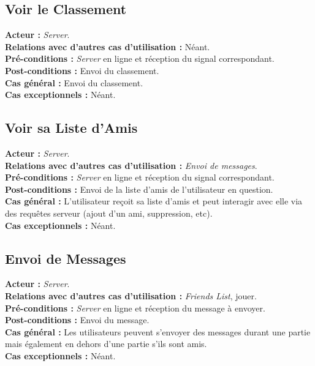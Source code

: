 \documentclass[10pt, a4paper]{article}
\begin{document}
\subsection{Voir le Classement}
\textbf{Acteur :} \textit{Server}. \\
\textbf{Relations avec d'autres cas d'utilisation :} Néant. \\
\textbf{Pré-conditions :} \textit{Server} en ligne et réception du signal correspondant. \\
\textbf{Post-conditions :} Envoi du classement. \\
\textbf{Cas général :} Envoi du classement. \\
\textbf{Cas exceptionnels :} Néant. \\

\subsection{Voir sa Liste d'Amis}
\textbf{Acteur :} \textit{Server}. \\
\textbf{Relations avec d'autres cas d'utilisation :} {\itshape Envoi de messages}. \\
\textbf{Pré-conditions :} \textit{Server} en ligne et réception du signal correspondant. \\
\textbf{Post-conditions :} Envoi de la liste d'amis de l'utilisateur en question. \\
\textbf{Cas général :} L'utilisateur reçoit sa liste d'amis et peut interagir avec elle via des requêtes serveur (ajout d'un ami, suppression, etc).\\
\textbf{Cas exceptionnels :} Néant. \\

\subsection{Envoi de Messages}
\textbf{Acteur :} \textit{Server}. \\
\textbf{Relations avec d'autres cas d'utilisation :} \textit{Friends List}, jouer. \\
\textbf{Pré-conditions :} \textit{Server} en ligne et réception du message à envoyer. \\
\textbf{Post-conditions :} Envoi du message. \\
\textbf{Cas général :} Les utilisateurs peuvent s'envoyer des messages durant une partie mais également en dehors d'une partie s'ils sont amis. \\
\textbf{Cas exceptionnels :} Néant. \\
\end{document}

